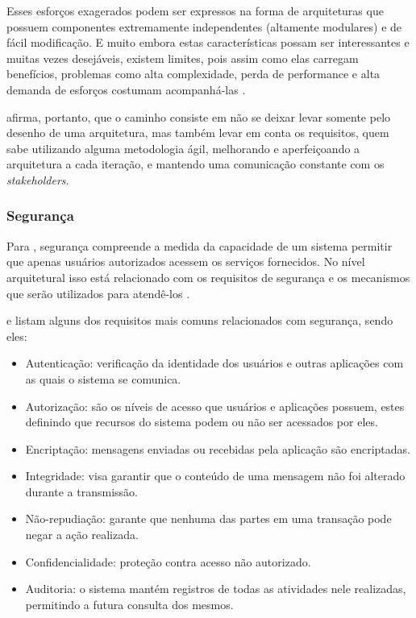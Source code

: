 \documentclass[diss]{template/setrem}
\begin{document}
Esses esforços exagerados podem ser expressos na forma de arquiteturas que possuem componentes extremamente independentes (altamente modulares) e de fácil modificação. E muito embora estas características possam ser interessantes e muitas vezes desejáveis, existem limites, pois assim como elas carregam benefícios, problemas como alta complexidade, perda de performance e alta demanda de esforços costumam acompanhá-las \citep{Gorton2011}.

\citet{Gorton2011} afirma, portanto, que o caminho consiste em não se deixar levar somente pelo desenho de uma arquitetura, mas também levar em conta os requisitos, quem sabe utilizando alguma metodologia ágil, melhorando e aperfeiçoando a arquitetura a cada iteração, e mantendo uma comunicação constante com os \emph{stakeholders}.

\subsubsection{Segurança}
Para \citet{Bass2003}, segurança compreende a medida da capacidade de um sistema permitir que apenas usuários autorizados acessem os serviços fornecidos. No nível arquitetural isso está relacionado com os requisitos de segurança e os mecanismos que serão utilizados para atendê-los \citep{Gorton2011}.

\citet{Gorton2011} e \citet{Bass2003} listam alguns dos requisitos mais comuns relacionados com segurança, sendo eles:
\begin{itemize}
	\item Autenticação: verificação da identidade dos usuários e outras aplicações com as quais o sistema se comunica.
	\item Autorização: são os níveis de acesso que usuários e aplicações possuem, estes definindo que recursos do sistema podem ou não ser acessados por eles.
	\item Encriptação: mensagens enviadas ou recebidas pela aplicação são encriptadas.
	\item Integridade: visa garantir que o conteúdo de uma mensagem não foi alterado durante a transmissão.
	\item Não-repudiação: garante que nenhuma das partes em uma transação pode negar a ação realizada.
	\item Confidencialidade: proteção contra acesso não autorizado.
	\item Auditoria: o sistema mantém registros de todas as atividades nele realizadas, permitindo a futura consulta dos mesmos.
\end{itemize}
\end{document}
